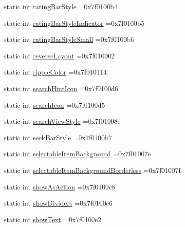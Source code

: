 \begin{DoxyCompactItemize}
\item 
static int \hyperlink{classandroid_1_1support_1_1v7_1_1appcompat_1_1R_1_1attr_ad8092b6dfc3e1e74cfb135768ce06f81}{rating\+Bar\+Style} =0x7f0100b4
\item 
static int \hyperlink{classandroid_1_1support_1_1v7_1_1appcompat_1_1R_1_1attr_a3ca56be9fcffd4b6eca62a54767c55bf}{rating\+Bar\+Style\+Indicator} =0x7f0100b5
\item 
static int \hyperlink{classandroid_1_1support_1_1v7_1_1appcompat_1_1R_1_1attr_a449778fbfb018f0be16f0bb702ae6c0e}{rating\+Bar\+Style\+Small} =0x7f0100b6
\item 
static int \hyperlink{classandroid_1_1support_1_1v7_1_1appcompat_1_1R_1_1attr_acd83a3fdb876fe9d37c12f157cf90972}{reverse\+Layout} =0x7f010002
\item 
static int \hyperlink{classandroid_1_1support_1_1v7_1_1appcompat_1_1R_1_1attr_a48d6a24411e563366d3c82b2505a0e8c}{ripple\+Color} =0x7f010114
\item 
static int \hyperlink{classandroid_1_1support_1_1v7_1_1appcompat_1_1R_1_1attr_a408b8a2fc893dd24796a5646f93c512e}{search\+Hint\+Icon} =0x7f0100d6
\item 
static int \hyperlink{classandroid_1_1support_1_1v7_1_1appcompat_1_1R_1_1attr_a4b1621015b9ec79e6c6c880ccde1250d}{search\+Icon} =0x7f0100d5
\item 
static int \hyperlink{classandroid_1_1support_1_1v7_1_1appcompat_1_1R_1_1attr_a3b487a2c2eeefc8dd4642311349b1a22}{search\+View\+Style} =0x7f01008e
\item 
static int \hyperlink{classandroid_1_1support_1_1v7_1_1appcompat_1_1R_1_1attr_aaa05c0c5eafda565ce4da73a3b31958c}{seek\+Bar\+Style} =0x7f0100b7
\item 
static int \hyperlink{classandroid_1_1support_1_1v7_1_1appcompat_1_1R_1_1attr_a87c474abcdf634b03663abfe1d1ad911}{selectable\+Item\+Background} =0x7f01007e
\item 
static int \hyperlink{classandroid_1_1support_1_1v7_1_1appcompat_1_1R_1_1attr_aab4c287d6aa1e792e2151d495253b9aa}{selectable\+Item\+Background\+Borderless} =0x7f01007f
\item 
static int \hyperlink{classandroid_1_1support_1_1v7_1_1appcompat_1_1R_1_1attr_a37a658e9544ba1803be9daef3fbaa0e3}{show\+As\+Action} =0x7f0100c8
\item 
static int \hyperlink{classandroid_1_1support_1_1v7_1_1appcompat_1_1R_1_1attr_a7d2a1f3c253160c329280ef49c5a5eba}{show\+Dividers} =0x7f0100c6
\item 
static int \hyperlink{classandroid_1_1support_1_1v7_1_1appcompat_1_1R_1_1attr_a0d2df05a7372eac5cd163b46c11f5dad}{show\+Text} =0x7f0100e2

\end{DoxyCompactItemize}
